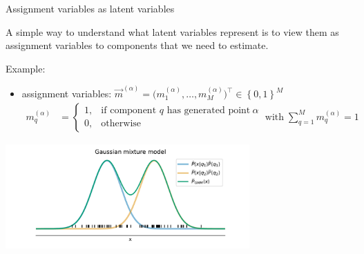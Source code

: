 \begin{frame}{Assignment variables as latent variables}

A simple way to understand what latent variables represent is to view them as assignment variables to components that we need to estimate.

Example:\\

\begin{itemize} 
\item assignment variables: $\vec{m}^{(\alpha)} =  \big( m_1^{(\alpha)}, \dots, m_M^{(\alpha)} \big)^\top \in \left\{ 0, 1 \right\}^M$ \\
		\begin{align}
		m_q^{(\alpha)} &= 
		\begin{cases}
		1, & \text{if component } q \text{ has generated point}~\alpha\\
		0, & \text{otherwise}
		\end{cases}
		\;\text{with} \;
		 \sum_{q=1}^{M} m_q^{(\alpha)} = 1 
		\end{align}
\end{itemize}

\svspace{-7mm}


\begin{center}
	\includegraphics[width=0.7\textwidth]{img/latentexample_gmm}
\end{center}


\end{frame}


